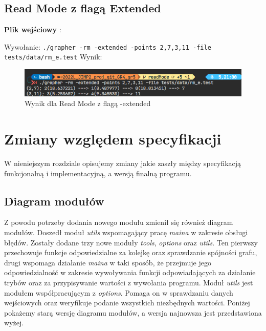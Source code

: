 \documentclass[10pt, a4paper]{report}
\begin{document}
    \subsection{Read Mode z flagą Extended}
    \textbf{Plik wejściowy} :
    
    Wywołanie:
    \newline\newline \texttt{./grapher -rm -extended -points 2,7,3,11 -file tests/data/rm\_e.test}
    \newline\newline Wynik:
    \begin{figure}[ht]
        \begin{center}
            \includegraphics[scale=0.8]{rm_e.png}
            \caption {Wynik dla Read Mode z flagą -extended}
        \end{center}
    \end{figure}

    \newpage
    \section{Zmiany względem specyfikacji}
    W nieniejszym rozdziale opisujemy zmiany jakie zaszły między specyfikacją funkcjonalną i implementacyjną, a wersją finalną programu.

    \subsection{Diagram modułów}
    Z powodu potrzeby dodania nowego modułu zmienił się również diagram modułów.
    Doszedł moduł \textit{utils} wspomagający pracę \textit{maina} w zakresie obsługi błędów. Zostały dodane trzy nowe moduły \textit{tools}, \textit{options} oraz \textit{utils}. Ten pierwszy przechowuje funkcje odpowiedzialne za kolejkę oraz sprawdzanie spójności grafu, drugi
    wspomaga działanie \textit{maina} w taki sposób, że przejmuje jego odpowiedzialność w zakresie wywoływania funkcji odpowiadających za działanie trybów oraz za przypisywanie wartości z wywołania programu. Moduł \textit{utils} jest modułem współpracującym z \textit{options}.
    Pomaga on w sprawdzaniu danych wejściowych oraz weryfikuje podanie wszystkich niezbędnych wartości.
    Poniżej pokażemy starą wersję diagramu modułów, a wersja najnowsza jest przedstawiona wyżej.
\end{document}
